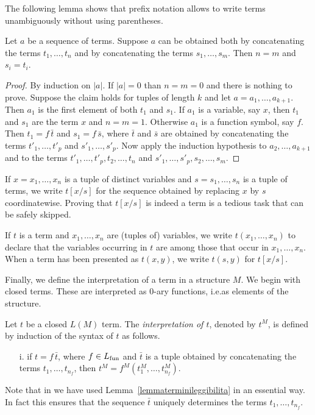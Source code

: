 The following lemma shows that prefix notation allows to write terms unambiguously without using parentheses.

\begin{lemma}\label{lemmaterminileggibilita}
Let $a$ be a sequence of terms. Suppose $a$ can be obtained both by concatenating the terms $t_1,\dots,t_n$ and by concatenating the terms $s_1,\dots,s_m$. Then $n=m$ and $s_i=t_i$.
\end{lemma}
\begin{proof}
By induction on $|a|$. If $|a|=0$ than $n=m=0$ and there is nothing to prove. Suppose the claim holds for tuples of length $k$ and let $a=a_1,\dots,a_{k+1}$. Then $a_1$ is the first element of both  $t_1$ and $s_1$. If $a_1$ is a variable, say $x$, then $t_1$ and $s_1$ are the term $x$ and $n=m=1$. Otherwise $a_1$ is a function symbol, say $f$. Then $t_1=f\,\bar t$ and $s_1=f\,\bar s$, where $\bar t$ and $\bar s$ are obtained by concatenating the terms $t'_1, \dots, t'_p$ and $s'_1, \dots, s'_p$.  Now apply the induction hypothesis to $a_2,\dots,a_{k+1}$ and to the terms $t'_1, \dots,t'_p,t_2,\dots,t_n$ and $s'_1,\dots,s'_p,s_2,\dots,s_m$.
\end{proof}

If $x=x_1,\dots,x_n$ is a tuple of distinct variables and $s=s_1,\dots,s_n$ is a tuple of terms, we write \emph{$t[x/s]$\/} for the sequence obtained by replacing $x$ by $s$ coordinatewise. Proving that $t[x/s]$ is indeed a term is a tedious task that can be safely skipped.

If $t$ is a term and $x_1,\dots,x_n$ are (tuples of) variables, we write \emph{$t(x_1,\dots,x_n)$\/} to declare that the variables occurring in $t$ are among those that occur in $x_1,\dots,x_n$. When a term has been presented as $t(x,y)$, we write \emph{$t(s,y)$\/} for $t[x/s]$.

Finally, we define the interpretation of a term in a structure $M$. We begin with closed terms. These are interpreted as $0$-ary functions, i.e.\@ as elements of the structure.

\begin{definition}\label{defterminiinterpretazione}
Let $t$ be a closed $L(M)$ term. The \emph{interpretation of $t$}, denoted by \emph{$t^M$}, is defined by induction of the syntax of $t$ as follows.

\begin{itemize}
\item[i.] if $t=f\,\bar t$, where $f\in L_{\rm fun}$ and $\bar t$ is a tuple obtained by concatenating the terms $t_1,\dots,t_{n_f}$, then $t^M=f^M(t^M_1, \dots, t^M_{n_f})$.
\end{itemize}
Note that in  we have used Lemma~\ref{lemmaterminileggibilita} in an essential way. In fact this ensures that the sequence $\bar t$ uniquely determines the terms $t_1, \dots, t_{n_f}$.\QED
\end{definition}

